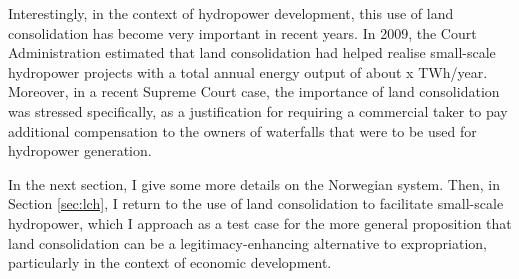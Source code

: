 Interestingly, in the context of hydropower development, this use of land consolidation has become very important in recent years. In 2009, the Court Administration estimated that land consolidation had helped realise small-scale hydropower projects with a total annual energy output of about x TWh/year. Moreover, in a recent Supreme Court case, the importance of land consolidation was stressed specifically, as a justification for requiring a commercial taker to pay additional compensation to the owners of waterfalls that were to be used for hydropower generation.

In the next section, I give some more details on the Norwegian system. Then, in Section \ref{sec:lch}, I return to the use of land consolidation to facilitate small-scale hydropower, which I approach as a test case for the more general proposition that land consolidation can be a legitimacy-enhancing alternative to expropriation, particularly in the context of economic development.


